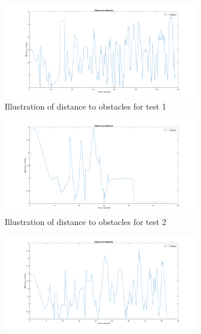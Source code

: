 \documentclass[../Head/Main.tex]{subfiles}
\begin{document}
\begin{figure}[H]
\begin{subfigure}[b]{0.49\textwidth}
    \centering
    \includegraphics[width=0.95\textwidth]{../Figures/MatlabPlots/MarblesTest1}
    \caption{Illustration of distance to obstacles for test 1}
    \label{fig:MarbleTest1}
  \end{subfigure}
  \hfill
  \begin{subfigure}[b]{0.49\textwidth}
    \centering
    \includegraphics[width=0.95\textwidth]{../Figures/MatlabPlots/MarblesTest2}
    \caption{Illustration of distance to obstacles for test 2}
    \label{fig:MarbleTest2}
  \end{subfigure}
  \hfill
  \begin{subfigure}[b]{0.49\textwidth}
    \centering
    \includegraphics[width=0.95\textwidth]{../Figures/MatlabPlots/MarblesTest3}

\end{subfigure}
\end{figure}
\end{document}
